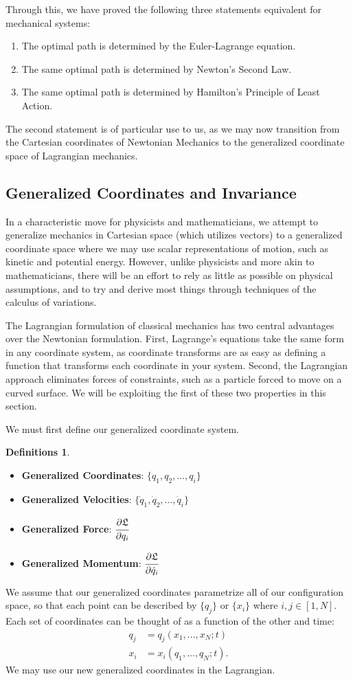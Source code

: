 \documentclass[10pt, psamsfonts]{amsart}
\theoremstyle{definition}
\newtheorem{defns}[thm]{Definitions}
\theoremstyle{remark}
\numberwithin{equation}{section}
\begin{document}
Through this, we have proved the following three statements equivalent for mechanical systems:
\begin{enumerate}
\item The optimal path is determined by the Euler-Lagrange equation.
\item The same optimal path is determined by Newton's Second Law.
\item The same optimal path is determined by Hamilton's Principle of Least Action.
\end{enumerate}
The second statement is of particular use to us, as we may now transition from the Cartesian coordinates of Newtonian Mechanics to the generalized coordinate space of Lagrangian mechanics.

\subsection{Generalized Coordinates and Invariance}
In a characteristic move for physicists and mathematicians, we attempt to generalize mechanics in Cartesian space (which utilizes vectors) to a generalized coordinate space where we may use scalar representations of motion, such as kinetic and potential energy. 
However, unlike physicists and more akin to mathematicians, there will be an effort to rely as little as possible on physical assumptions, and to try and derive most things through techniques of the calculus of variations.

The Lagrangian formulation of classical mechanics has two central advantages over the Newtonian formulation. First, Lagrange's equations take the same form in any coordinate system, as coordinate transforms are as easy as defining a function that transforms each coordinate in your system. Second, the Lagrangian approach eliminates forces of constraints, such as a particle forced to move on a curved surface. We will be exploiting the first of these two properties in this section.

We must first define our generalized coordinate system.
\begin{defns}
\;
\begin{itemize}
\item[] \textbf{Generalized Coordinates}: $\{q_1, q_2, ..., q_i\}$
\item[] \textbf{Generalized Velocities}: $\{\dot{q}_1, \dot{q}_2, ..., \dot{q}_i\}$
\item[] \textbf{Generalized Force}: $\cfrac{\partial \mathfrak{L}}{\partial q_i} $
\item[] \textbf{Generalized Momentum}: $\cfrac{\partial \mathfrak{L}}{\partial \dot{q}_i}$
\end{itemize}
\end{defns}
\noindent We assume that our generalized coordinates parametrize all of our configuration space, so that each point can be described by $\{q_j\}$ or $\{x_i\}$ where $i, j \in [1, N]$. Each set of coordinates can be thought of as a function of the other and time:
\begin{align*}
  q_j &= q_j(x_1,...,x_N; t)\\
  x_i &= x_i(q_1,...,q_N; t).
\end{align*}
We may use our new generalized coordinates in the Lagrangian.
\end{document}
